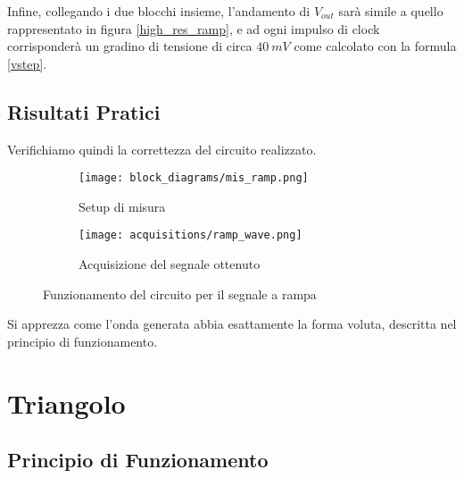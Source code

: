 Infine, collegando i due blocchi insieme, l'andamento di $V_{out}$ sarà simile a quello
rappresentato in figura \ref{high_res_ramp}, e ad ogni impulso di clock corrisponderà un
gradino di tensione di circa $40\ mV$ come calcolato con la formula \ref{vstep}.


\subsection*{Risultati Pratici}


Verifichiamo quindi la correttezza del circuito realizzato.

\begin{figure}[H]
    \centering

    \begin{subfigure}{.5\textwidth}
        \centering
        \texttt{[image: block\_diagrams/mis\_ramp.png]}
        \caption{Setup di misura}
        \label{mis_ramp}
    \end{subfigure}%
    \begin{subfigure}{.5\textwidth}
        \centering
        \texttt{[image: acquisitions/ramp\_wave.png]}
        \caption{Acquisizione del segnale ottenuto}
        \label{acq_ramp}
    \end{subfigure}

    \caption{Funzionamento del circuito per il segnale a rampa}
    \label{acq_ramp_signals}
\end{figure}

Si apprezza come l'onda generata abbia esattamente la forma voluta, descritta nel
principio di funzionamento.


\section{Triangolo}


\subsection*{Principio di Funzionamento}

